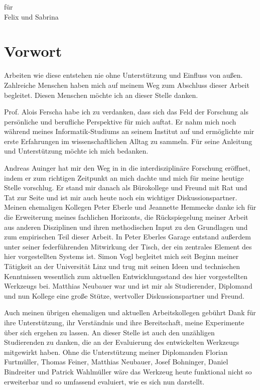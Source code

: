 \vspace*{\fill}

\begin{center}
\Large
für \\
Felix und Sabrina
\end{center}

\vspace*{\fill}

\cleardoublepage

\section*{Vorwort} %
\label{sec:vorwort}

Arbeiten wie diese entstehen nie ohne Unterstützung und Einfluss von außen. Zahlreiche Menschen haben mich auf meinem Weg zum Abschluss dieser Arbeit begleitet. Diesen Menschen möchte ich an dieser Stelle danken.

Prof. Alois Ferscha habe ich zu verdanken, dass sich das Feld der Forschung als persönliche und berufliche Perspektive für mich auftat. Er nahm mich noch während meines Informatik-Studiums an seinem Institut auf und ermöglichte mir erste Erfahrungen im wissenschaftlichen Alltag zu sammeln. Für seine Anleitung und Unterstützung möchte ich mich bedanken.

Andreas Auinger hat mir den Weg in in die interdisziplinäre Forschung eröffnet, indem er zum richtigen Zeitpunkt an mich dachte und mich für meine heutige Stelle vorschlug. Er stand mir danach als Bürokollege und Freund mit Rat und Tat zur Seite und ist mir auch heute noch ein wichtiger Diskussionspartner. Meinen ehemaligen Kollegen Peter Eberle und Jeannette Hemmecke danke ich für die Erweiterung meines fachlichen Horizonts, die Rückspiegelung meiner Arbeit aus anderen Disziplinen und ihren methodischen Input zu den Grundlagen und zum empirischen Teil dieser Arbeit. In Peter Eberles Garage entstand außerdem unter seiner federführenden Mitwirkung der Tisch, der ein zentrales Element des hier vorgestellten Systems ist. Simon Vogl begleitet mich seit Beginn meiner Tätigkeit an der Universität Linz und trug mit seinen Ideen und technischen Kenntnissen wesentlich zum aktuellen Entwicklungsstand des hier vorgestellten Werkzeugs bei. Matthias Neubauer war und ist mir als Studierender, Diplomand und nun Kollege eine große Stütze, wertvoller Diskussionspartner und Freund. 

Auch meinen übrigen ehemaligen und aktuellen Arbeitskollegen gebührt Dank für ihre Unterstützung, ihr Verständnis und ihre Bereitschaft, meine Experimente über sich ergehen zu lassen. An dieser Stelle ist auch den unzähligen Studierenden zu danken, die an der Evaluierung des entwickelten Werkzeugs mitgewirkt haben. Ohne die Unterstützung meiner Diplomanden Florian Furtmüller, Thomas Feiner, Matthias Neubauer, Josef Bohninger, Daniel Bindreiter und Patrick Wahlmüller wäre das Werkzeug heute funktional nicht so erweiterbar und so umfassend evaluiert, wie es sich nun darstellt.

